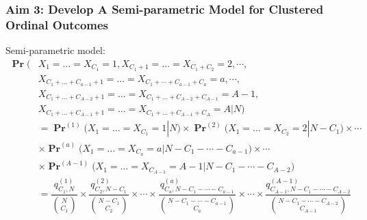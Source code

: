 \documentclass[hyperref={bookmarks=false},aspectratio=169]{beamer}
\begin{document}
\begin{frame}
\frametitle{Aim 3: Develop A Semi-parametric Model for Clustered Ordinal Outcomes}

\alert{Semi-parametric model}:
\begin{equation*}\label{M:SPforOrdinal3}
\begin{split}
    \boldsymbol{\Pr} \big( & X_1 = \dots = X_{C_1} = 1,  X_{C_1 + 1} = \dots = X_{C_1 + C_2} = 2, \cdots, \\
   & X_{C_1 + \dots + C_{a-1} + 1} = \dots = X_{C_1 + \cdots + C_{a-1} +  C_{a}} = a, \cdots, \\
   & X_{C_1 + \dots + C_{A-2} + 1} = \dots = X_{C_1 + \dots + C_{A-2} +  C_{A-1}} = A-1, \\
   & X_{C_1 + \dots + C_{A-1} + 1} = \dots = X_{C_1 + \dots + C_{A-1} +  C_{A}} = A | N \big) \\
   & = {\boldsymbol{\Pr}}^{(1)} \big( X_1 = \dots = X_{C_1} = 1 | N \big) \times {\boldsymbol{\Pr}}^{(2)} \big(X_{1} = \dots = X_{C_2} = 2 | N - C_1\big) \times \cdots \\
   & \times {\boldsymbol{\Pr}}^{(a)} \big(X_{1} = \dots = X_{C_{a}} = a | N - C_1 - \cdots - C_{a-1} \big) \times \cdots \\
   & \times {\boldsymbol{\Pr}}^{(A-1)} \big(X_{1} = \dots = X_{C_{A-1}} = A-1 | N - C_1 - \cdots - C_{A-2} \big) \\
   & = \dfrac{q^{(1)}_{C_1,N}}{\binom{N}{C_1}} \times \dfrac{q^{(2)}_{C_2,N - C_1}}{\binom{N - C_1}{C_2}} \times \cdots \times \dfrac{q^{(a)}_{C_{a},N - C_1 - \cdots - C_{a-1}}}{\binom{N - C_1 - \cdots - C_{a-1}}{C_a}} \times \cdots \times \dfrac{q^{(A-1)}_{C_{A-1},N - C_1 - \cdots - C_{A-2}}}{\binom{N - C_1 - \cdots - C_{A-2}}{C_{A-1}}}
\end{split}
\end{equation*}

\end{frame}
\end{document}

